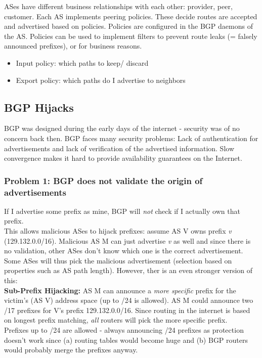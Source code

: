 \documentclass[11pt,oneside,a4paper]{article}
\begin{document}
\newpage

\noindent ASes have different business relationships with each other: provider, peer, customer. Each AS implements peering policies. These decide routes are accepted and advertised based on policies. Policies are configured in the BGP daemons of the AS. Policies can be used to implement filters to prevent route leaks (= falsely announced prefixes), or for business reasons.

\vspace{-\topsep}
\begin{itemize}
	\setlength{\itemsep}{0pt}
	\setlength{\parskip}{0pt}
	\item Input policy: which paths to keep/ discard
	\item Export policy: which paths do I advertise to neighbors
\end{itemize}
\vspace{-\topsep}

\subsection{BGP Hijacks}

BGP was designed during the early days of the internet - security was of no concern back then. BGP faces many security problems: Lack of authentication for advertisements and lack of verification of the advertised information. Slow convergence makes it hard to provide availability guarantees on the Internet.

\subsubsection{Problem 1: BGP does not validate the origin of advertisements}
\label{bgp_problem_1}

If I advertise some prefix as mine, BGP will \textit{not} check if I actually own that prefix.\\
This allows malicious ASes to hijack prefixes: assume AS V owns prefix \textit{v} (129.132.0.0/16). Malicious AS M can just advertise \textit{v} as well and since there is no validation, other ASes don't know which one is the correct advertisement.  Some ASes will thus pick the malicious advertisement (selection based on properties such as AS path length). However, ther is an even stronger version of this:\\

\noindent \textbf{Sub-Prefix Hijacking:} AS M can announce a \textit{more specific} prefix for the victim's (AS V) address space (up to /24 is allowed). AS M could announce two /17 prefixes for V's prefix 129.132.0.0/16. Since routing in the internet is based on longest prefix matching, \textit{all} routers will pick the more specific prefix.\\
Prefixes up to /24 are allowed - always announcing /24 prefixes as protection doesn't work since (a) routing tables would become huge and (b) BGP routers would probably merge the prefixes anyway.
\end{document}
